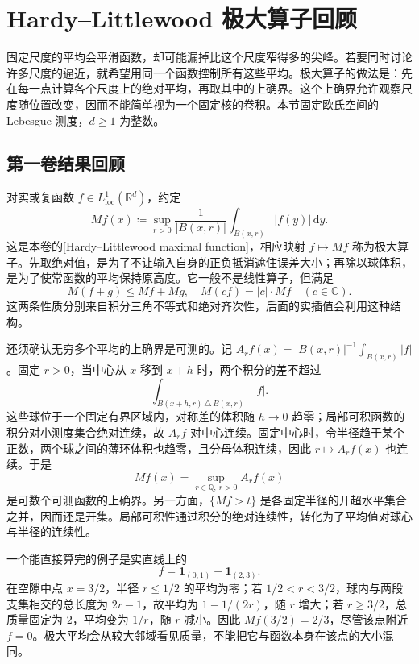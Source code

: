 \section{Hardy–Littlewood 极大算子回顾}
\label{b2:sec:1701}

固定尺度的平均会平滑函数，却可能漏掉比这个尺度窄得多的尖峰。若要同时讨论许多尺度的逼近，就希望用同一个函数控制所有这些平均。极大算子的做法是：先在每一点计算各个尺度上的绝对平均，再取其中的上确界。这个上确界允许观察尺度随位置改变，因而不能简单视为一个固定核的卷积。本节固定欧氏空间的 Lebesgue 测度，\(d\geq1\) 为整数。

\subsection{第一卷结果回顾}
\label{b2:subsec:170101}

对实或复函数 \(f\in L^1_{\mathrm{loc}}(\mathbb R^d)\)，约定
\[
 Mf(x)\coloneqq\sup_{r>0}\dfrac1{|B(x,r)|}\int_{B(x,r)}|f(y)|\,\mathrm dy.
\]
这是本卷的[Hardy--Littlewood maximal function]，相应映射 \(f\mapsto Mf\) 称为极大算子。先取绝对值，是为了不让输入自身的正负抵消遮住误差大小；再除以球体积，是为了使常函数的平均保持原高度。它一般不是线性算子，但满足
\[M(f+g)\leq Mf+Mg,\quad M(cf)=|c|\cdot Mf\quad(c\in\mathbb C).\]
这两条性质分别来自积分三角不等式和绝对齐次性，后面的实插值会利用这种结构。

\ProseParagraphBreak

还须确认无穷多个平均的上确界是可测的。记 \(A_rf(x)=|B(x,r)|^{-1}\int_{B(x,r)}|f|\)。固定 \(r>0\)，当中心从 \(x\) 移到 \(x+h\) 时，两个积分的差不超过
\[\int_{B(x+h,r)\,\triangle\,B(x,r)}|f|.\]
这些球位于一个固定有界区域内，对称差的体积随 \(h\to0\) 趋零；局部可积函数的积分对小测度集合绝对连续，故 \(A_rf\) 对中心连续。固定中心时，令半径趋于某个正数，两个球之间的薄环体积也趋零，且分母体积连续，因此 \(r\mapsto A_rf(x)\) 也连续。于是
\[Mf(x)=\sup_{r\in\mathbb Q,\ r>0}A_rf(x)\]
是可数个可测函数的上确界。另一方面，\(\{Mf>t\}\) 是各固定半径的开超水平集合之并，因而还是开集。局部可积性通过积分的绝对连续性，转化为了平均值对球心与半径的连续性。

\ProseParagraphBreak

一个能直接算完的例子是实直线上的
\[f=\mathbf1_{(0,1)}+\mathbf1_{(2,3)}.\]
在空隙中点 \(x=3/2\)，半径 \(r\leq1/2\) 的平均为零；若 \(1/2<r<3/2\)，球内与两段支集相交的总长度为 \(2r-1\)，故平均为 \(1-1/(2r)\)，随 \(r\) 增大；若 \(r\geq3/2\)，总质量固定为 \(2\)，平均变为 \(1/r\)，随 \(r\) 减小。因此 \(Mf(3/2)=2/3\)，尽管该点附近 \(f=0\)。极大平均会从较大邻域看见质量，不能把它与函数本身在该点的大小混同。

